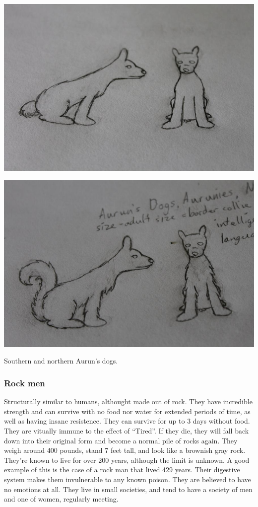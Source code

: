 \documentclass[11pt]{article}
\begin{document}
\begin{center}
\includegraphics[width=.9\linewidth]{./assets/southern auruns dogs.jpg}
\end{center}\begin{center}
\includegraphics[width=.9\linewidth]{./assets/northern auruns dogs.JPG}
\end{center}
Southern and northern Aurun's dogs.
\subsubsection*{Rock men}
\label{sec:org175e613}
Structurally similar to humans, althought made out of rock.
They have incredible strength and can survive with no food nor water for extended periods of time, as well as having insane resistence. They can survive for up to 3 days without food.
They are vitually immune to the effect of ``Tired''.
If they die, they will fall back down into their original form and become a normal pile of rocks again.
They weigh around 400 pounds, stand 7 feet tall, and look like a brownish gray rock.
They're known to live for over 200 years, although the limit is unknown. A good example of this is the case of a rock man that lived 429 years.
Their digestive system makes them invulnerable to any known poison.
They are believed to have no emotions at all.
They live in small societies, and tend to have a society of men and one of women, regularly meeting.
\end{document}

